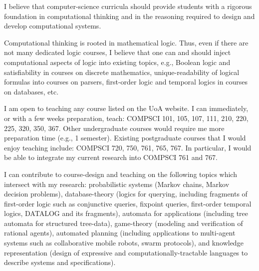 \documentclass[10,a4paper,sans]{moderncv}
\begin{document}
I believe that computer-science curricula should provide students with a rigorous foundation in computational thinking and in the reasoning required to design and develop computational systems. 

Computational thinking is rooted in mathematical logic. Thus, even if there are not many dedicated logic courses, I believe that one can and should inject computational aspects of logic into existing topics, e.g., Boolean logic and satisfiability in courses on discrete mathematics, unique-readability of logical formulas into courses on parsers, first-order logic and temporal logics in courses on databases, etc. 


I am open to teaching any course listed on the UoA website. I can immediately, or with a few weeks preparation, teach: COMPSCI 101, 105, 107, 111, 210, 220, 225, 320, 350, 367. Other undergraduate courses would require me more preparation time (e.g., 1 semester). Existing postgraduate courses that I would enjoy teaching include: COMPSCI 720, 750, 761, 765, 767. 	In particular, I would be able to integrate my current research into COMPSCI 761 and 767. 

I can contribute to course-design and teaching on the following topics which intersect with my research: probabilistic systems (Markov chains, Markov decision problems), database-theory (logics for querying, including fragments of first-order logic such as conjunctive queries, fixpoint queries, first-order temporal logics, DATALOG and its fragments), automata for applications (including tree automata for structured tree-data), game-theory (modeling and verification of rational agents), automated planning (including applications to multi-agent systems such as collaborative mobile robots, swarm protocols), and knowledge representation (design of expressive and computationally-tractable languages to describe systems and specifications).
\end{document}
